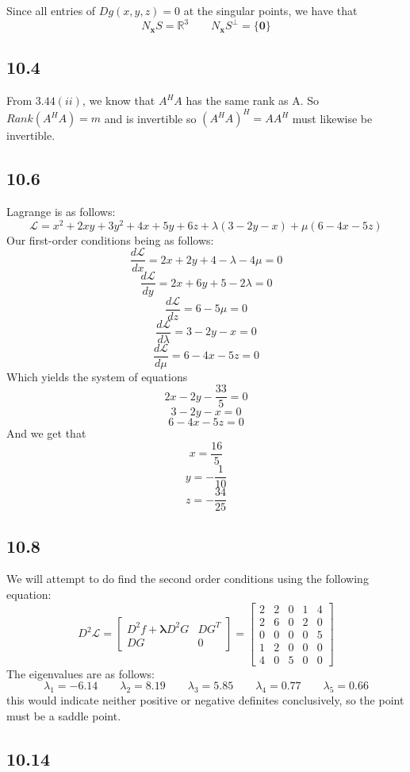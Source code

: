 \documentclass[letterpaper,12pt]{article}
\theoremstyle{definition}
\begin{document}
Since all entries of $Dg(x,y,z) = 0$ at the singular points, we have that \[N_{\mathbf{x}}S = \mathbb{R}^3 \qquad N_{\mathbf{x}}S^{\perp} = \{\mathbf{0}\}\]



\subsection*{10.4}


From $3.44 (ii)$, we know that $A^HA$ has the same rank as A. So $Rank(A^HA) = m$ and is invertible so $(A^HA)^H=AA^H$ must likewise be invertible.

\subsection*{10.6}
Lagrange is as follows:
\[\mathscr{L}=x^2+2xy+3y^2+4x+5y+6z+\lambda(3-2y-x)+\mu(6-4x-5z)\]
Our first-order conditions being as follows:
\[\frac{d\mathscr{L}}{dx}=2x+2y+4-\lambda-4\mu=0\]
\[\frac{d\mathscr{L}}{dy}=2x+6y+5-2\lambda=0\]
\[\frac{d\mathscr{L}}{dz}=6-5\mu=0\]
\[\frac{d\mathscr{L}}{d\lambda}=3-2y-x=0\]
\[\frac{d\mathscr{L}}{d\mu}=6-4x-5z=0\]
Which yields the system of equations
\[2x-2y-\frac{33}{5}=0\]
\[3-2y-x=0\]
\[6-4x-5z=0\]
And we get that
\[x=\frac{16}{5}\]
\[y=-\frac{1}{10}\]
\[z=-\frac{34}{25}\]


\subsection*{10.8}

We will attempt to do find the second order conditions using the following equation:
\[D^2\mathscr{L}=
\begin{bmatrix}
D^2f+\mathbf{\lambda}D^2G & DG^T\\
DG & 0 \end{bmatrix}=\begin{bmatrix}
2&2&0&1&4\\
2&6&0&2&0\\
0&0&0&0&5\\
1&2&0&0&0\\
4&0&5&0&0 \end{bmatrix}
\]
The eigenvalues are as follows: \[\lambda_1=-6.14   \qquad \lambda_2=8.19 \qquad\lambda_3=5.85\qquad\lambda_4=0.77\qquad\lambda_5=0.66\] this would indicate neither positive or negative definites conclusively, so the point must be a saddle point. 

\subsection*{10.14}
\end{document}
